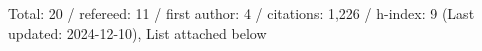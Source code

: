Total: 20 / refereed: 11 / first author: 4 / citations: 1,226 / h-index: 9 (Last updated: 2024-12-10), List attached below